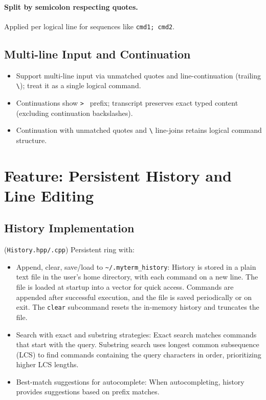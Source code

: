\documentclass[11pt,a4paper]{article}
\begin{document}
\paragraph{Split by semicolon respecting quotes.} Applied per logical line for sequences like \verb!cmd1; cmd2!.

\subsection{Multi-line Input and Continuation}
\begin{itemize}[leftmargin=*]
  \item Support multi-line input via unmatched quotes and line-continuation (trailing \verb!\!); treat it as a single logical command.
  \item Continuations show \verb!> ! prefix; transcript preserves exact typed content (excluding continuation backslashes).
  \item Continuation with unmatched quotes and \texttt{\textbackslash} line-joins retains logical command structure.
\end{itemize}


\section{Feature: Persistent History and Line Editing}

\subsection{History Implementation}
(\texttt{History.hpp/.cpp}) Persistent ring with:
\begin{itemize}[leftmargin=*]
  \item Append, clear, save/load to \texttt{\textasciitilde/.myterm\_history}: History is stored in a plain text file in the user's home directory, with each command on a new line. The file is loaded at startup into a vector for quick access. Commands are appended after successful execution, and the file is saved periodically or on exit. The \texttt{clear} subcommand resets the in-memory history and truncates the file.
  \item Search with exact and substring strategies: Exact search matches commands that start with the query. Substring search uses longest common subsequence (LCS) to find commands containing the query characters in order, prioritizing higher LCS lengths.
  \item Best-match suggestions for autocomplete: When autocompleting, history provides suggestions based on prefix matches.
\end{itemize}
\end{document}
